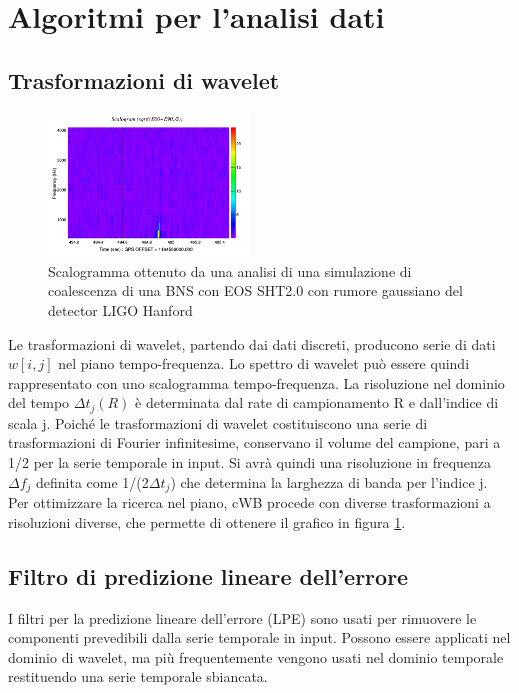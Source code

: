 \section{Algoritmi per l'analisi dati}
\subsection{Trasformazioni di wavelet}
\label{subsection:wavelet_transform}
\begin{figure}
	\vspace{-35pt}
	\begin{center}
		\includegraphics[width=0.475\textwidth]{figures/Capitolo_3/L1_scalogram_0.png}
	\end{center}
	\vspace{-5pt}
	\caption{Scalogramma ottenuto da una analisi di una simulazione di coalescenza di una BNS con EOS SHT2.0 con rumore gaussiano del detector LIGO Hanford}
	\label{fig:scalogram_example}
	\vspace{-40pt}
\end{figure}
Le trasformazioni di wavelet, partendo dai dati discreti, producono serie di dati $w[i,j]$ nel piano tempo-frequenza. Lo spettro di wavelet può essere quindi rappresentato con uno scalogramma tempo-frequenza. La risoluzione nel dominio del tempo $\Delta t_j(R)$ è determinata dal rate di campionamento R e dall'indice di scala j. Poiché le trasformazioni di wavelet costituiscono una serie di trasformazioni di Fourier infinitesime, conservano il volume del campione, pari a 1/2 per la serie temporale in input. Si avrà quindi una risoluzione in frequenza $\Delta f_j$ definita come 1/(2$\Delta t_j$) che determina la larghezza di banda per l'indice j. Per ottimizzare la ricerca nel piano, cWB procede con diverse trasformazioni a risoluzioni diverse, che permette di ottenere il grafico in figura \ref{fig:scalogram_example}.
\subsection{Filtro di predizione lineare dell'errore}
\label{subsection:lpe_filter}
I filtri per la predizione lineare dell'errore (LPE) sono usati per rimuovere le componenti prevedibili dalla serie temporale in input. Possono essere applicati nel dominio di wavelet, ma più frequentemente vengono usati nel dominio temporale restituendo una serie temporale sbiancata.

